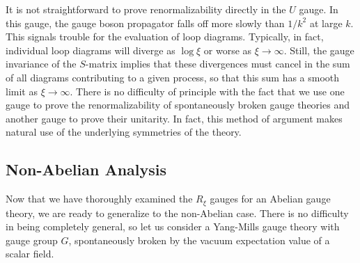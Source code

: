 It is not straightforward to prove renormalizability directly in the $U$
gauge.  In this gauge, the gauge boson propagator falls off more slowly than
$1/k^2$ at large $k$.  This signals trouble for the evaluation of loop
diagrams.  Typically, in fact, individual loop diagrams will diverge as
$\log\xi$ or worse as $\xi\to\infty$.  Still, the gauge invariance of the
$S$-matrix implies that these divergences must cancel in the sum of all
diagrams contributing to a given process, so that this sum has a smooth limit
as $\xi\to\infty$.  There is no difficulty of principle with the fact that we
use one gauge to prove the renormalizability of spontaneously broken gauge
theories and another gauge to prove their unitarity.  In fact, this method of
argument makes natural use of the underlying symmetries of the theory.

\subsection{Non-Abelian Analysis}

Now that we have thoroughly examined the $R_\xi$ gauges for an Abelian gauge
theory, we are ready to generalize to the non-Abelian case.  There is no
difficulty in being completely general, so let us consider a Yang-Mills gauge
theory with gauge group $G$, spontaneously broken by the vacuum expectation
value of a scalar field.

